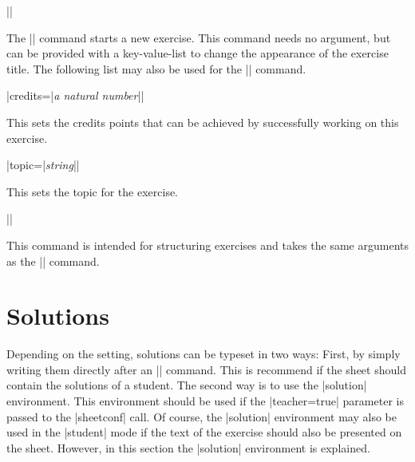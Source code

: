 \documentclass[a4paper,fleqn]{report}
\def\syntaxdefaultarg#1{\hfill\texttt{\small #1}\par\smallskip\noindent\ignorespaces}
\def\metaargument#1{\textit{\small #1}}
\begin{document}
\begin{syntax}
  |\exercise[|\metaargument{key-value-list}|]| \syntaxdefaultarg{}
  The |\exercise| command starts a new exercise. This command needs no
  argument, but can be provided with a key-value-list to change the
  appearance of the exercise title. The following list may also be
  used for the |\subexercise| command.
  \begin{syntax}
    |credits={|\metaargument{a natural number}|}| \syntaxdefaultarg{}
    This sets the credits points that can be achieved by successfully
    working on this exercise.
  \end{syntax}
  \begin{syntax}
    |topic={|\metaargument{string}|}| \syntaxdefaultarg{}
    This sets the topic for the exercise.
  \end{syntax}
\end{syntax}

\begin{syntax}
  |\subexercise[|\metaargument{key-value-list}|]| \syntaxdefaultarg{}
  This command is intended for structuring exercises and takes the
  same arguments as the |\exercise| command.
\end{syntax}


\section{Solutions}

Depending on the setting, solutions can be typeset in two ways: First,
by simply writing them directly after an |\exercise| command. This is
recommend if the sheet should contain the solutions of a student. The
second way is to use the |solution| environment. This environment
should be used if the |teacher=true| parameter is passed to the
|sheetconf| call. Of course, the |solution| environment may also be
used in the |student| mode if the text of the exercise should also be
presented on the sheet. However, in this section the |solution|
environment is explained.
\end{document}
